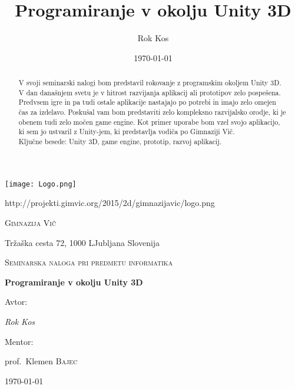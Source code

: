 \documentclass[a4paper,oneside,12pt]{article} %
\title{Programiranje v okolju Unity 3D}
\author{Rok Kos}
\date{\today}
\begin{document}
	
	\begin{titlepage}
		\centering
		\texttt{[image: Logo.png]}\par
		{\tiny http://projekti.gimvic.org/2015/2d/gimnazijavic/logo.png} \par\vspace{1cm}
		{\scshape\LARGE Gimnazija Vič \par}
		Tržaška cesta 72, 1000 LJubljana Slovenija \par
		\vspace{1cm}
		{\scshape\Large Seminarska naloga pri predmetu informatika\par}
		\vspace{1.5cm}
		{\huge\bfseries Programiranje v okolju Unity 3D\par}
		\vspace{2cm}
		Avtor: \par
		{\Large\itshape Rok Kos \par}
		\vfill
		Mentor:\par
		prof.~Klemen \textsc{Bajec}

		\vfill

		{\large \today\par}
	\end{titlepage}


	\newpage %
	\tableofcontents

	\listoffigures
	
	\newpage

	\begin{abstract}
		V svoji seminarski nalogi bom predstavil rokovanje z programskim okoljem Unity 3D.\\
		V dan današnjem svetu je v hitrost razvijanja aplikacij ali prototipov zelo pospešena. Predvsem igre in pa tudi ostale aplikacije nastajajo po potrebi in imajo zelo omejen čas za izdelavo. Poskušal vam bom predstaviti zelo kompleksno razvijalsko orodje, ki je obenem tudi zelo močen game engine. Kot primer uporabe bom vzel svojo aplikacijo, ki sem jo ustvaril z Unity-jem, ki predstavlja vodiča po Gimnaziji Vič.\\

		Ključne besede: Unity 3D, game engine, prototip, razvoj aplikacij.
	\end{abstract}
	
\end{document}
